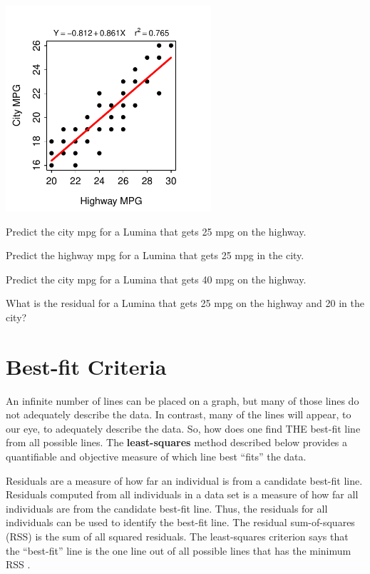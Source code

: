 \documentclass[10pt,openany]{book}\usepackage[]{graphicx}\usepackage[]{color}
\begin{document}
\begin{exsection}
\begin{center}
  \includegraphics[width=3in]{Figs/LuminaFLP-1}
\end{center}
    \begin{Enumerate}
      \item Predict the city mpg for a Lumina that gets 25 mpg on the highway.
      \item Predict the highway mpg for a Lumina that gets 25 mpg in the city.
      \item Predict the city mpg for a Lumina that gets 40 mpg on the highway.
      \item What is the residual for a Lumina that gets 25 mpg on the highway and 20 in the city?
    \end{Enumerate}
\end{exsection}

\newpage
\section{Best-fit Criteria}\label{sect:BestFitLine}
\vspace{-12pt}
An infinite number of lines can be placed on a graph, but many of those lines do not adequately describe the data.  In contrast, many of the lines will appear, to our eye, to adequately describe the data.  So, how does one find THE best-fit line from all possible lines. The \textbf{least-squares} method described below provides a quantifiable and objective measure of which line best ``fits'' the data.

Residuals are a measure of how far an individual is from a candidate best-fit line.  Residuals computed from all individuals in a data set is a measure of how far all individuals are from the candidate best-fit line.  Thus, the residuals for all individuals can be used to identify the best-fit line. The residual sum-of-squares (RSS) is the sum of all squared residuals.  The least-squares criterion says that the ``best-fit'' line is the one line out of all possible lines that has the minimum RSS .
\end{document}
